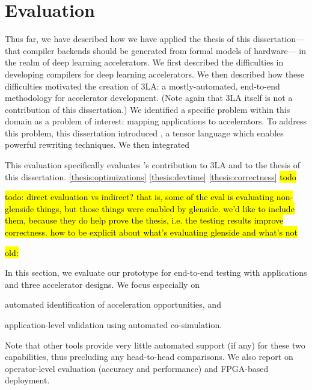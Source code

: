 \chapter{Evaluation}
\label{sec:part1-evaluation}

Thus far, we have described
  how we have applied
  the thesis of this dissertation---%
  that compiler backends
  should be generated
  from formal models of hardware---%
  in the realm of deep learning accelerators.
We first described the difficulties
  in developing compilers
  for deep learning accelerators.
We then described how these difficulties
  motivated the creation of
  3LA: a mostly-automated, end-to-end
  methodology
  for accelerator development.
(Note again that 3LA itself
  is not a contribution of this dissertation.)
We identified a specific problem
  within this domain
  as a problem of interest:
  mapping applications to accelerators.
To address this problem,
  this dissertation
  introduced
  \g,
  a tensor language
  which enables powerful rewriting techniques.
We then integrated \g 
  

This evaluation specifically evaluates
  \g's contribution
  to 3LA
  and to the thesis of this dissertation.
\cref{thesis:optimizations}
\cref{thesis:devtime}
\cref{thesis:correctness}
\hl{todo}

\hl{todo: direct evaluation vs indirect? that is, some of the eval is evaluating non-glenside things, but those things were enabled by glenside. we'd like to include them, because they do help prove the thesis, i.e. the testing results improve correctness. how to be explicit about what's evaluating glenside and what's not}
  

\hl{old:}

In this section, 
  we evaluate our prototype 
  for end-to-end testing with \AppNum applications and three accelerator designs. We focus especially on
\begin{inlinelist}
\item automated identification of acceleration opportunities, and 
\item application-level validation using automated co-simulation.   
\end{inlinelist}
%
Note that other tools provide very little automated support (if any)
for these two capabilities, thus precluding any head-to-head comparisons. 
We also report on operator-level evaluation (accuracy and performance) and FPGA-based deployment.

